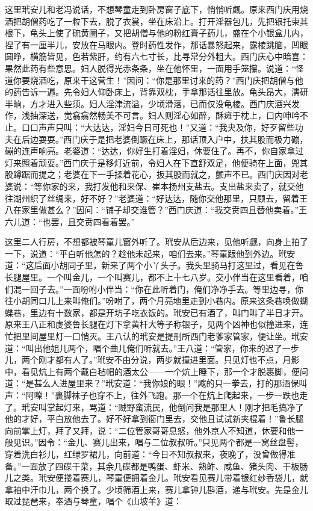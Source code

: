 这里玳安儿和老冯说话，不想琴童走到卧房窗子底下，悄悄听觑。原来西门庆用烧酒把胡僧药吃了一粒下去，脱了衣裳，坐在床沿上。打开淫器包儿，先把银托束其根下，龟头上使了硫黄圈子，又把胡僧与他的粉红膏子药儿，盛在个小银盒儿内，捏了有一厘半儿，安放在马眼内。登时药性发作，那话暴怒起来，露棱跳脑，凹眼圆睁，横筋皆见，色若紫肝，约有六七寸长，比寻常分外粗大。西门庆心中暗喜：果然此药有些意思。妇人脱得光赤条条，坐在他怀里，一面用手笼攥。说道：“怪道你要烧酒吃，原来干这营生！”因问：“你是那里讨来的药？”西门庆把胡僧与他的药告诉一遍。先令妇人仰卧床上，背靠双枕，手拿那话往里放。龟头昂大，濡研半晌，方才进入些须。妇人淫津流溢，少顷滑落，已而仅没龟棱。西门庆酒兴发作，浅抽深送，觉翕翕然畅美不可言。妇人则淫心如醉，酥瘫于枕上，口内呻吟不止。口口声声只叫：“大\textMaoJi \textMaoBa 达达，淫妇今日可死也！”又道：“我央及你，好歹留些功夫在后边耍耍。”西门庆于是把老婆倒蹶在床上，那话顶入户中，扶其股而极力\textShan 磞，\textShan 磞的连声响亮。老婆道：“达达，你好生\textShan 打着淫妇，休要住了。再不，你自家拿过灯来照着顽耍。”西门庆于是移灯近前，令妇人在下直舒双足，他便骑在上面，兜其股蹲踞而提之；老婆在下一手揉着花心，扳其股而就之，颤声不已。西门庆因对老婆说：“等你家的来，我打发他和来保、崔本扬州支盐去。支出盐来卖了，就交他往湖州织了丝绸来，好不好？”老婆道：“好达达，随你交他那里，只顾去，留着王八在家里做甚么？”因问：“铺子却交谁管？”西门庆道：“我交贲四且替他卖着。”王六儿道：“也罢，且交贲四看着罢。”

这里二人行房，不想都被琴童儿窗外听了。玳安从后边来，见他听觑，向身上拍了一下，说道：“平白听他怎的？趁他未起来，咱们去来。”琴童跟他到外边。玳安道：“这后面小胡同子里，新来了两个小丫头子。我头里骑马打这里过，看见在鲁长腿屋里。一个叫金儿，一个叫赛儿，都不上十七八岁。交小伴当在这里看着，咱们混一回子去。”一面吩咐小伴当：“你在此听着门，俺们净净手去。等里边寻，你往小胡同口儿上来叫俺们。”吩咐了，两个月亮地里走到小巷内。原来这条巷唤做蝴蝶巷，里边有十数家，都是开坊子吃衣饭的。玳安已有酒了，叫门叫了半日才开。原来王八正和虔婆鲁长腿在灯下拿黄杆大等子称银子，见两个凶神也似撞进来，连忙把里间屋里灯一口悄灭。王八认的玳安是提刑所西门老爹家管家，便让坐。玳安道：“叫出他姐儿两个，唱个曲儿俺们听就去。”王八道：“管家，你来的迟了一步儿，两个刚才都有人了。”玳安不由分说，两步就撞进里面。只见灯也不点，月影中，看见炕上有两个戴白毡帽的酒太公——一个炕上睡下，那一个才脱裹脚，便问道：“是甚么人进屋里来？”玳安道：“我你娘的眼！”飕的只一拳去，打的那酒保叫声：“阿嚛！”裹脚袜子也穿不上，往外飞跑。那一个在炕上爬起来，一步一跌也走了。玳安叫掌起灯来，骂道：“贼野蛮流民，他倒问我是那里人！刚才把毛搞净了他的才好，平白放他去了。好不好拿到衙门里去，交他且试试新夹棍着！”鲁长腿向前掌上灯，拜了又拜，说：“二位管家哥哥息怒，他外京人不知道，休要和他一般见识。”因令：“金儿、赛儿出来，唱与二位叔叔听。”只见两个都是一窝丝盘髻，穿着洗白衫儿，红绿罗裙儿，向前道：“今日不知叔叔来，夜晚了，没曾做得准备。”一面放了四碟干菜，其余几碟都是鸭蛋、虾米、熟鲊、咸鱼、猪头肉、干板肠儿之类。玳安便搂着赛儿，琴童便拥着金儿。玳安看见赛儿带着银红纱香袋儿，就拿袖中汗巾儿，两个换了。少顷筛酒上来，赛儿拿钟儿斟酒，递与玳安。先是金儿取过琵琶来，奉酒与琴童，唱个《山坡羊》道：

